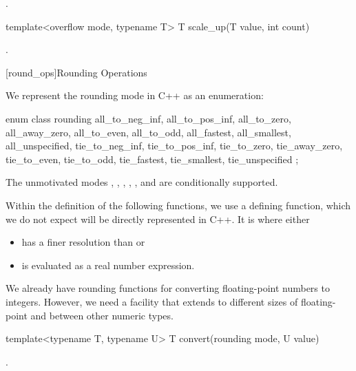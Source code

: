 \begin{addedblock}
\begin{itemdescr}
\returns {}.	
\end{itemdescr}

\begin{itemdecl}
template<overflow mode, typename T> T scale_up(T value, int count)		
\end{itemdecl}

\begin{itemdescr}
\returns {}.	
\end{itemdescr}

[round_ops]{Rounding Operations}

We represent the rounding mode in C++ as an enumeration:

\begin{codeblock}
enum class rounding {
	all_to_neg_inf, all_to_pos_inf,
	all_to_zero, all_away_zero,
	all_to_even, all_to_odd,
	all_fastest, all_smallest,
	all_unspecified,
	tie_to_neg_inf, tie_to_pos_inf,
	tie_to_zero, tie_away_zero,
	tie_to_even, tie_to_odd,
	tie_fastest, tie_smallest,
	tie_unspecified
};
\end{codeblock}

The unmotivated modes , , , , , and  are conditionally supported.

Within the definition of the following functions, we use a defining function, which we do not expect will be directly represented in C++. It is  where  either

\begin{itemize}
\item has a finer resolution than  or
\item is evaluated as a real number expression.
\end{itemize}

We already have rounding functions for converting floating-point numbers to integers. However, we need a facility that extends to different sizes of floating-point and between other numeric types.

\begin{itemdecl}
template<typename T, typename U> T convert(rounding mode, U value)		
\end{itemdecl}

\begin{itemdescr}
\returns {}.	
\end{itemdescr}


\end{addedblock}
